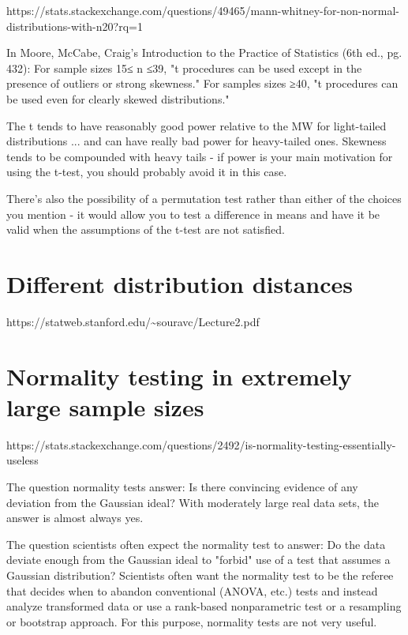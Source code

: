 \documentclass[11pt]{article}
\begin{document}
https://stats.stackexchange.com/questions/49465/mann-whitney-for-non-normal-distributions-with-n20?rq=1

In Moore, McCabe, Craig's Introduction to the Practice of Statistics
(6th ed., pg. 432): For sample sizes 15≤ n ≤39, "t procedures can be
used except in the presence of outliers or strong skewness." For samples
sizes ≥40, "t procedures can be used even for clearly skewed
distributions."

The t tends to have reasonably good power relative to the MW for
light-tailed distributions ... and can have really bad power for
heavy-tailed ones. Skewness tends to be compounded with heavy tails - if
power is your main motivation for using the t-test, you should probably
avoid it in this case.

There's also the possibility of a permutation test rather than either of
the choices you mention - it would allow you to test a difference in
means and have it be valid when the assumptions of the t-test are not
satisfied.

\section{Different distribution
distances}\label{different-distribution-distances}

https://statweb.stanford.edu/\textasciitilde{}souravc/Lecture2.pdf

\section{Normality testing in extremely large sample
sizes}\label{normality-testing-in-extremely-large-sample-sizes}

https://stats.stackexchange.com/questions/2492/is-normality-testing-essentially-useless

The question normality tests answer: Is there convincing evidence of any
deviation from the Gaussian ideal? With moderately large real data sets,
the answer is almost always yes.

The question scientists often expect the normality test to answer: Do
the data deviate enough from the Gaussian ideal to "forbid" use of a
test that assumes a Gaussian distribution? Scientists often want the
normality test to be the referee that decides when to abandon
conventional (ANOVA, etc.) tests and instead analyze transformed data or
use a rank-based nonparametric test or a resampling or bootstrap
approach. For this purpose, normality tests are not very useful.
\end{document}
